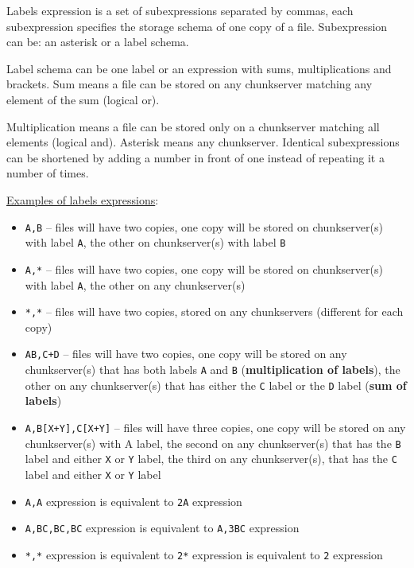\documentclass[a4paper,11pt,english]{report}
\def\code#1{\texttt{#1}}
\begin{document}
					Labels expression is a set of subexpressions separated by commas, each subexpression specifies the storage schema of one copy of a file. Subexpression can be: an asterisk or a label schema.
					
					Label schema can be one label or an expression with sums, multiplications and brackets. Sum means a file can be stored on any chunkserver matching any element of the sum (logical or).
					
					Multiplication means a file can be stored only on a chunkserver matching all elements (logical and).  Asterisk means any chunkserver. Identical subexpressions can be shortened by adding a  number  in  front  of  one	instead of repeating it a number of times.
		
					\bigskip		
				
					\underline{Examples of labels expressions}:
				
					\begin{itemize}
						\item \code{A,B} -- files will have two copies, one copy will be stored on chunkserver(s) with label \code{A}, the other on chunkserver(s) with label \code{B}
				
						\item \code{A,*} -- files will have two copies, one copy will be stored on chunkserver(s) with label \code{A}, the other on any chunkserver(s)
				
						\item \code{*,*} -- files will have two copies, stored on any chunkservers (different for each copy)
					
						\item \code{AB,C+D} -- files will have two copies, one copy will be stored on any chunkserver(s) that has both labels \code{A} and \code{B} (\textbf{multiplication of labels}), the other on any chunkserver(s) that has either the \code{C} label or the \code{D} label (\textbf{sum of labels})
				
						\item \code{A,B[X+Y],C[X+Y]} -- files will have three copies, one copy will be stored on any chunkserver(s) with A label, the second on any chunkserver(s) that has the \code{B} label and either \code{X} or \code{Y} label, the third on any chunkserver(s), that has the \code{C} label and either \code{X} or \code{Y} label
				
						\item \code{A,A} expression is equivalent to \code{2A} expression
				
						\item \code{A,BC,BC,BC} expression is equivalent to \code{A,3BC} expression
				
						\item \code{*,*} expression is equivalent to \code{2*} expression is equivalent to \code{2} expression
					\end{itemize}
					
\end{document}
